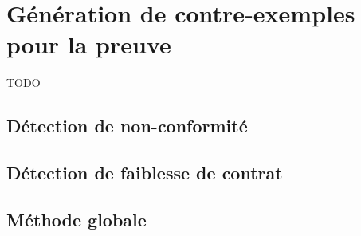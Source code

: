 
\chapter{Génération de contre-exemples pour la preuve}
\label{sec:ce}


TODO

\section{Détection de non-conformité}
\section{Détection de faiblesse de contrat}
\section{Méthode globale}

